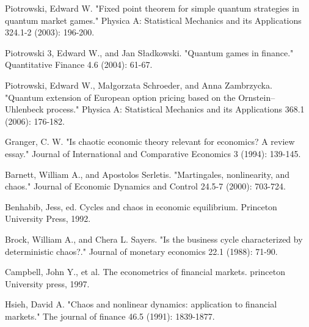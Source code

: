 \documentclass[a4paper,titlepage,12pt,fleqn,oneside]{report}
\begin{document}
\begin{thebibliography}{99}
\begin{LTRitems}
	Piotrowski, Edward W. "Fixed point theorem for simple quantum strategies in quantum market games." Physica A: Statistical Mechanics and its Applications 324.1-2 (2003): 196-200.
\end{LTRitems}

\begin{LTRitems}
	Piotrowski 3, Edward W., and Jan Sładkowski. "Quantum games in finance." Quantitative Finance 4.6 (2004): 61-67.
\end{LTRitems}

\begin{LTRitems}
	Piotrowski, Edward W., Małgorzata Schroeder, and Anna Zambrzycka. "Quantum extension of European option pricing based on the Ornstein–Uhlenbeck process." Physica A: Statistical Mechanics and its Applications 368.1 (2006): 176-182.
\end{LTRitems}

\begin{LTRitems}
	Granger, C. W. "Is chaotic economic theory relevant for economics? A review essay." Journal of International and Comparative Economics 3 (1994): 139-145.
\end{LTRitems}

\begin{LTRitems}
	Barnett, William A., and Apostolos Serletis. "Martingales, nonlinearity, and chaos." Journal of Economic Dynamics and Control 24.5-7 (2000): 703-724.
\end{LTRitems}

\begin{LTRitems}
	Benhabib, Jess, ed. Cycles and chaos in economic equilibrium. Princeton University Press, 1992.
\end{LTRitems}

\begin{LTRitems}
	Brock, William A., and Chera L. Sayers. "Is the business cycle characterized by deterministic chaos?." Journal of monetary economics 22.1 (1988): 71-90.
\end{LTRitems}

\begin{LTRitems}
	Campbell, John Y., et al. The econometrics of financial markets. princeton University press, 1997.
\end{LTRitems}

\begin{LTRitems}
	Hsieh, David A. "Chaos and nonlinear dynamics: application to financial markets." The journal of finance 46.5 (1991): 1839-1877.
\end{LTRitems}


\end{thebibliography}
\end{document}
